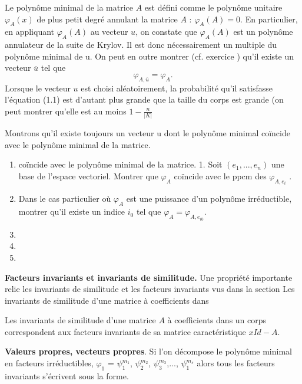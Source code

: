 Le polynôme minimal de la matrice $A$ est défini comme le polynôme unitaire
$\varphi_{A}\left(x\right)$ de plus petit degré annulant la matrice $A$ : $\varphi_{A}\left(A\right) = 0$. En particulier, en appliquant $\varphi_{A}\left(A\right)$ au vecteur $u$, on constate que $\varphi_{A}\left(A\right)$ est un polynôme annulateur de la suite de Krylov. Il est donc nécessairement un multiple du polynôme minimal de u. On peut en outre montrer (cf. exercice ) qu’il existe un vecteur $\overline{u}$ tel que
\begin{equation}
 \varphi_{A, \overline{u}} = \varphi_{A}.
\end{equation}
Lorsque le vecteur $u$ est choisi aléatoirement, la probabilité qu’il satisfasse l’équation (1.1) est d’autant plus grande que la taille du corps est grande (on peut montrer qu’elle est au moins $1-\frac{n}{\vert K \vert}$ 
\begin{exercise}
Montrons qu’il existe toujours un vecteur u dont le polynôme minimal coïncide avec le polynôme minimal de la matrice.
 \begin{enumerate}
    \item coïncide avec le polynôme minimal de la matrice. 1. Soit $\left(e_{1},..., e_{n}\right)$ une base de l’espace vectoriel. Montrer que $\varphi_{A}$ coïncide avec le ppcm des $\varphi_{A, e_{i}}$ .
    \item  Dans le cas particulier où $\varphi_{A}$ est une puissance d’un polynôme irréductible, montrer qu’il existe un indice $i_{0}$ tel que $\varphi_{A} =\varphi_{A, e_{i0}}$.
    \item 
    \item 
    \item 
  \end{enumerate}
\end{exercise}
\textbf{Facteurs invariants et invariants de similitude.}  Une propriété importante relie les invariants de similitude et les facteurs invariants vus dans la section  Les invariants de similitude d’une matrice  à coefficients dans
\begin{theorem}
Les invariants de similitude d’une matrice $A$ à coefficients dans un corps correspondent aux facteurs invariants de sa matrice caractéristique $xId - A$.
\end{theorem}
\textbf{Valeurs propres, vecteurs propres}. Si l’on décompose le polynôme minimal en facteurs irréductibles, 
$\varphi_{1}$ = $\psi_{1}^{m_{1}}$, $\psi_{2}^{m_{2}}$, $\psi_{3}^{m_{3}}$,..., $\psi_{1}^{m_{s}}$ alors tous les facteurs invariants s’écrivent sous la forme.
